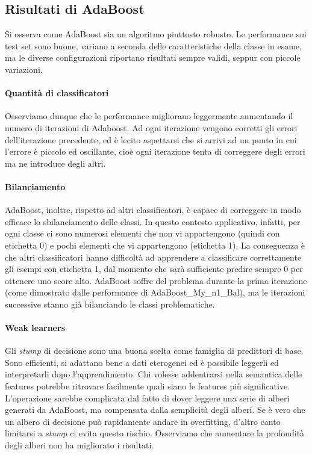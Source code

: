 \documentclass[12pt,a4paper,oneside,hidelinks]{report}
\begin{document}
\subsection{Risultati di AdaBoost}
Si osserva come AdaBoost sia un algoritmo piuttosto robusto. Le performance sui test set sono buone, variano a seconda delle caratteristiche della classe in esame, ma le diverse configurazioni riportano risultati sempre validi, seppur con piccole variazioni.

\paragraph{Quantità di classificatori}
Osserviamo dunque che le performance migliorano leggermente aumentando il numero di iterazioni di Adaboost. Ad ogni iterazione vengono corretti gli errori dell'iterazione precedente, ed è lecito aspettarsi che si arrivi ad un punto in cui l'errore è piccolo ed oscillante, cioè ogni iterazione tenta di correggere degli errori ma ne introduce degli altri.

\paragraph{Bilanciamento}
AdaBoost, inoltre, rispetto ad altri classificatori, è capace di correggere in modo efficace lo sbilanciamento delle classi. In questo contesto applicativo, infatti, per ogni classe ci sono numerosi elementi che non vi appartengono (quindi con etichetta 0) e pochi elementi che vi appartengono (etichetta 1). La conseguenza è che altri classificatori hanno difficoltà ad apprendere a classificare correttamente gli esempi con etichetta 1, dal momento che sarà sufficiente predire sempre 0 per ottenere uno score alto. AdaBoost soffre del problema durante la prima iterazione (come dimostrato dalle performance di AdaBoost\_My\_n1\_Bal), ma le iterazioni successive stanno già bilanciando le classi problematiche.

\paragraph{Weak learners}
Gli \emph{stump} di decisione sono una buona scelta come famiglia di predittori di base. Sono efficienti, si adattano bene a dati eterogenei ed è possibile leggerli ed interpretarli dopo l'apprendimento. Chi volesse addentrarsi nella semantica delle features potrebbe ritrovare facilmente quali siano le features più significative. L'operazione sarebbe complicata dal fatto di dover leggere una serie di alberi generati da AdaBoost, ma compensata dalla semplicità degli alberi. Se è vero che un albero di decisione può rapidamente andare in overfitting, d'altro canto limitarsi a \textit{stump} ci evita questo rischio. Osserviamo che aumentare la profondità degli alberi non ha migliorato i risultati.
\end{document}

